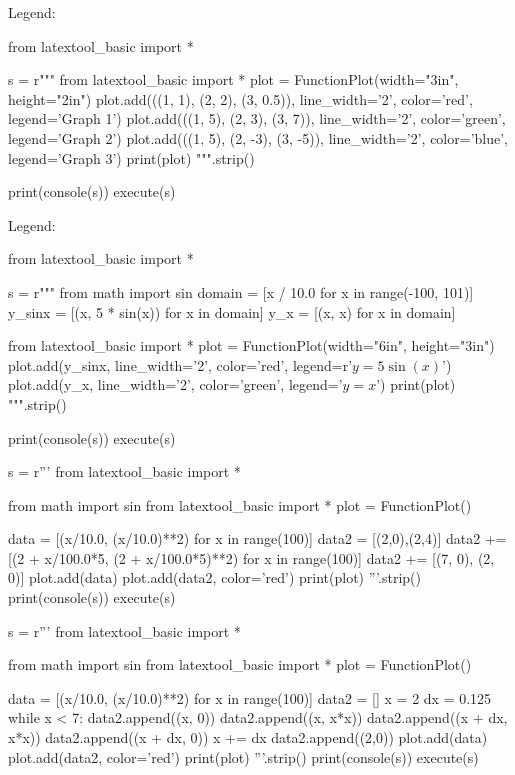 \newpage
Legend:
\begin{python}
from latextool_basic import *

s = r"""
from latextool_basic import *
plot = FunctionPlot(width="3in", height="2in")
plot.add(((1, 1), (2, 2), (3, 0.5)), line_width='2', color='red', legend='Graph 1')
plot.add(((1, 5), (2, 3), (3, 7)), line_width='2', color='green', legend='Graph 2')
plot.add(((1, 5), (2, -3), (3, -5)), line_width='2', color='blue', legend='Graph 3')
print(plot)
""".strip()

print(console(s))
execute(s)
\end{python}



\newpage
Legend:
\begin{python}
from latextool_basic import *

s = r"""
from math import sin
domain = [x / 10.0 for x in range(-100, 101)]
y_sinx = [(x, 5 * sin(x)) for x in domain]
y_x = [(x, x) for x in domain]

from latextool_basic import *
plot = FunctionPlot(width="6in", height="3in")
plot.add(y_sinx, line_width='2', color='red', legend=r'$y = 5 \sin(x)$')
plot.add(y_x, line_width='2', color='green', legend='$y = x$')
print(plot)
""".strip()

print(console(s))
execute(s)
\end{python}





\newpage
\begin{python}
s = r'''
from latextool_basic import *

from math import sin
from latextool_basic import *
plot = FunctionPlot()

data = [(x/10.0, (x/10.0)**2) for x in range(100)]
data2 = [(2,0),(2,4)]
data2 += [(2 + x/100.0*5, (2 + x/100.0*5)**2) for x in range(100)]
data2 += [(7, 0), (2, 0)]
plot.add(data)
plot.add(data2, color='red')
print(plot)
'''.strip()
print(console(s))
execute(s)
\end{python}


\newpage
\begin{python}
s = r'''
from latextool_basic import *

from math import sin
from latextool_basic import *
plot = FunctionPlot()

data = [(x/10.0, (x/10.0)**2) for x in range(100)]
data2 = []
x = 2
dx = 0.125
while x < 7:
    data2.append((x, 0))
    data2.append((x, x*x))
    data2.append((x + dx, x*x))
    data2.append((x + dx, 0))
    x += dx
data2.append((2,0))
plot.add(data)
plot.add(data2, color='red')
print(plot)
'''.strip()
print(console(s))
execute(s)
\end{python}


